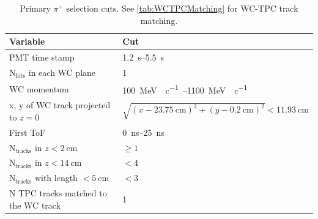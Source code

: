 \documentclass[letterpaper,12pt]{article}
\newcommand{\MeV}{\mega\electronvolt}
\newcommand{\MeVc}{\MeV{}\per c}
\newcommand{\pip}{\ensuremath{\pi^{+}}}
\begin{document}
\begin{table}[!hbtp]
  \begin{center}
    \small
    \caption{Primary \pip{} selection cuts. See \cref{tab:WCTPCMatching} for WC-TPC track matching.}
    \label{tab:pipCuts}
    \begin{tabu}{|l|l|} \hline
      Variable & Cut \\ \hline \hline
      PMT time stamp & \SIrange{1.2}{5.5}{\second} \\ \hline
      N$_{\text{hits}}$ in each WC plane & 1 \\ \hline
      WC momentum & \SIrange{100}{1100}{\MeVc{}} \\ \hline
      x, y of WC track projected to $z=0$ & $\sqrt{(x-\SI{23.75}{\cm})^2+(y-\SI{0.2}{\cm})^2} < \SI{11.93}{\cm}$ \\ \hline
      First ToF & \SIrange{0}{25}{\nano \second} \\ \hline
      N$_{\text{tracks}}$ in $z<\SI{2}{\cm}$ & $\geq 1$ \\ \hline
      N$_{\text{tracks}}$ in  $z<\SI{14}{\cm}$ & $< 4$ \\ \hline
      N$_{\text{tracks}}$ with length $<\SI{5}{\cm}$ & $< 3$ \\ \hline
      N TPC tracks matched to the WC track & 1 \\ \hline
    \end{tabu}
  \end{center}
\end{table}

\begin{table}[!hbtp]
  \begin{center}
    \small
    \caption{Wire chamber track to TPC track matching cuts.}
    \label{tab:WCTPCMatching}
  \end{center}
\end{table}
\end{document}
